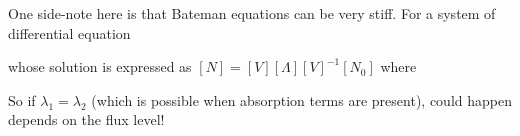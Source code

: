 \documentclass{school-22.211-notes}
\begin{document}
One side-note here is that Bateman equations can be very stiff. For a
system of differential equation 


whose solution is expressed as $[N] = [V] [\Lambda] [V]^{-1} [N_0]$ where 


So if $\lambda_1 = \lambda_2$ (which is possible when absorption terms
are present),  could happen depends on the
flux level!
\end{document}
